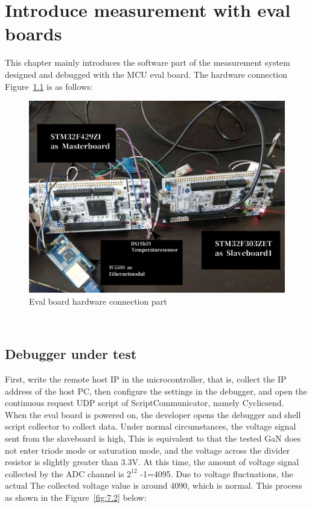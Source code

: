 \chapter{Introduce measurement with eval boards }
\label{chap:Introduce measurement with eval boards }
This chapter mainly introduces the software part of the measurement system designed and debugged with the MCU eval board. The hardware connection Figure~\ref{fig:7.1} is as follows:
\begin{figure}[!ht]
	\centering
	\includegraphics[width=16cm]{grafiken/7.1.eps}
	\caption{Eval board hardware connection part} 
	\label{fig:7.1}
\end{figure}
\FloatBarrier
\\


\section{Debugger under test}
\label{sec:Debugger under test}


First, write the remote host IP in the microcontroller, that is, collect the IP address of the host PC, then configure the settings in the debugger, and open the continuous request UDP script of ScriptCommunicator, namely Cyclicsend.
\\
When the eval board is powered on, the developer opens the debugger and shell script collector to collect data. Under normal circumstances, the voltage signal sent from the slaveboard is high, This is equivalent to that the tested GaN does not enter triode mode or saturation mode, and the voltage across the divider resistor is slightly greater than 3.3V. At this time, the amount of voltage signal collected by the ADC channel is $2^{12}$ -1=4095. Due to voltage fluctuations, the actual The collected voltage value is around 4090, which is normal. This process as shown in the Figure~\ref{fig:7.2} below:

